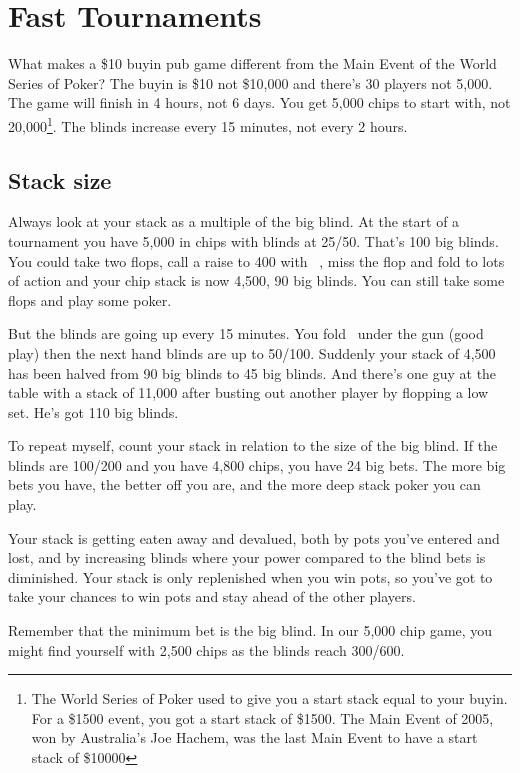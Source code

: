 \chapter{Fast Tournaments}


What makes a \$10 buyin pub game different from the Main Event of
the World Series of Poker? The buyin is \$10 not \$10,000 and there's 30
players not 5,000. The game will finish in 4 hours, not 6 days. You get
5,000 chips to start with, not 20,000\footnote{The World Series of Poker
used to give you a start stack equal to your buyin. For a \$1500 event,
you got a start stack of \$1500. The Main Event of 2005, won by Australia's
Joe Hachem, was the last Main Event to have a start stack of \$10000}.
The blinds increase every 15 minutes, not every 2 hours.

\section{Stack size}

Always look at your stack as a multiple of the big blind.
At the start of a tournament you have 5,000 in chips with blinds
at 25/50. That's 100 big blinds. You could take two flops, call a raise to
400 with \sixh\sixs\ , miss the flop and fold to lots of action and your
chip stack is now 4,500, 90 big blinds. You can still take some flops
and play some poker.

But the blinds are going up every 15 minutes. You fold \As\eigh\ under
the gun (good play) then the next hand blinds are up to 50/100.
Suddenly your stack of 4,500 has been halved from 90 big blinds to 45
big blinds. And there's one guy at the table with a stack of 11,000 after
busting out another player by flopping a low set. He's got 110 big blinds.

To repeat myself, count your stack in relation to the size of
the big blind. If the blinds are 100/200 and you have 4,800 chips, you
have 24 big bets. The more big bets you have, the better off you are,
and the more deep stack poker you can play.

Your stack is getting eaten away and devalued, both by pots you've entered
and lost, and by increasing blinds where your power compared to the blind bets
is diminished. Your stack is only replenished when you win pots, so you've
got to take your chances to win pots and stay ahead of the other players.

Remember that the minimum bet is the big blind. In our 5,000 chip
game, you might find yourself with 2,500 chips as the blinds reach 300/600.

